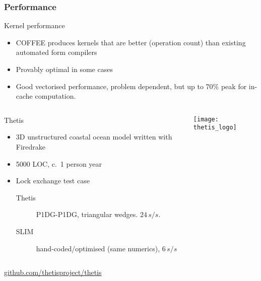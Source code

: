 \documentclass[presentation]{beamer}
\begin{document}
\begin{frame}[allowframebreaks]
  \frametitle{Performance}

  \begin{block}{Kernel performance}
    \begin{itemize}
    \item COFFEE produces kernels that are better (operation count)
      than existing automated form compilers
    \item Provably optimal in some cases
    \item Good vectorised performance, problem dependent, but up to
      70\% peak for in-cache computation.
    \end{itemize}
  \end{block}

\pagebreak

  \begin{columns}
    \begin{column}{0.7\textwidth}
      \begin{block}{Thetis}
        \begin{itemize}
        \item 3D unstructured coastal ocean model written with
          Firedrake
        \item 5000 LOC, c.~1 person year
        \item Lock exchange test case
          \begin{description}
          \item[Thetis] P1DG-P1DG, triangular wedges.  $24\, s/s$.
          \item[SLIM] hand-coded/optimised (same numerics),
            $6\, s/s$
          \end{description}
        \end{itemize}
      \end{block}
    \end{column}
    \begin{column}[t]{0.3\textwidth}
      \texttt{[image: thetis\_logo]}
    \end{column}
  \end{columns}
  \begin{center}
    \url{github.com/thetisproject/thetis}    
  \end{center}
\end{frame}
\end{document}
